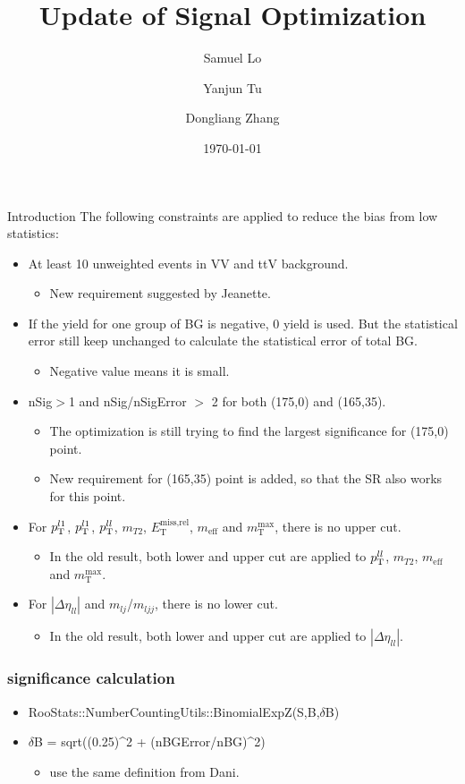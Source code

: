 \documentclass[mathserif,serif]{beamer}
\title[]{Update of Signal Optimization}
\author[]
{
Samuel Lo \inst{1}
\and
Yanjun Tu  \inst{1}
\and
Dongliang Zhang  \inst{2}
}
\institute[]
{
\inst{1}
The University of Hong Kong
\and
\inst{2}
University of Michigan
}
\date[]{\today}
\begin{document}
\frame{\titlepage}

\begin{frame}{Introduction}
\small
The following constraints are applied to reduce the bias from low statistics:
\begin{itemize}
\small
\item At least 10 unweighted events in VV and ttV background.
\begin{itemize}
\tiny
\item New requirement suggested by Jeanette.
\end{itemize}
\item If the yield for one group of BG is negative, 0 yield is used. But the statistical error still keep unchanged to calculate the statistical error of total BG.
\begin{itemize}
\tiny
\item Negative value means it is small.
\end{itemize}
\item nSig$>$1 and nSig/nSigError $>$ 2 for both (175,0) and (165,35).
\begin{itemize}
\tiny
\item The optimization is still trying to find the largest significance for (175,0) point.
\item New requirement for (165,35) point is added, so that the SR also works for this point.
\end{itemize}
\item For $p_{\text{T}}^{l1}$, $p_{\text{T}}^{l1}$, $p_{\text{T}}^{ll}$, $m_{T2}$, $E_{\text{T}}^{\text{miss,rel}}$, $m_{\text{eff}}$ and $m_{\text{T}}^{\text{max}}$, there is no upper cut.
\begin{itemize}
\tiny
\item In the old result, both lower and upper cut are applied to $p_{\text{T}}^{ll}$,  $m_{T2}$, $m_{\text{eff}}$ and $m_{\text{T}}^{\text{max}}$.
\end{itemize}
\item For $|\Delta\eta_{ll}|$ and $m_{lj}$/$m_{ljj}$, there is no lower cut.
\begin{itemize}
\tiny
\item In the old result, both lower and upper cut are applied to $|\Delta\eta_{ll}|$.
\end{itemize}
\end{itemize}
\end{frame}

\begin{frame}
\frametitle{significance calculation}
\begin{itemize}
\item RooStats::NumberCountingUtils::BinomialExpZ(S,B,$\delta$B)
\item $\delta$B = sqrt((0.25)\^{}2 + (nBGError/nBG)\^{}2)
\begin{itemize}
\item use the same definition from Dani.
\end{itemize}
\end{itemize}
\end{frame}
\end{document}
